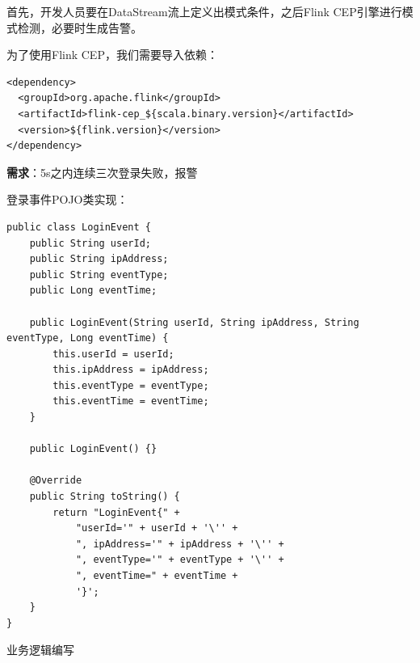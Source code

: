 \documentclass[cn,11pt,chinese]{elegantbook}
\begin{document}
首先，开发人员要在DataStream流上定义出模式条件，之后Flink CEP引擎进行模式检测，必要时生成告警。

为了使用Flink CEP，我们需要导入依赖：

\begin{verbatim}
<dependency>
  <groupId>org.apache.flink</groupId>
  <artifactId>flink-cep_${scala.binary.version}</artifactId>
  <version>${flink.version}</version>
</dependency>
\end{verbatim}

\textbf{需求}：5s之内连续三次登录失败，报警

登录事件POJO类实现：

\begin{verbatim}
public class LoginEvent {
    public String userId;
    public String ipAddress;
    public String eventType;
    public Long eventTime;
    
    public LoginEvent(String userId, String ipAddress, String eventType, Long eventTime) {
        this.userId = userId;
        this.ipAddress = ipAddress;
        this.eventType = eventType;
        this.eventTime = eventTime;
    }
    
    public LoginEvent() {}
    
    @Override
    public String toString() {
        return "LoginEvent{" +
            "userId='" + userId + '\'' +
            ", ipAddress='" + ipAddress + '\'' +
            ", eventType='" + eventType + '\'' +
            ", eventTime=" + eventTime +
            '}';
    }
}
\end{verbatim}

业务逻辑编写
\end{document}
